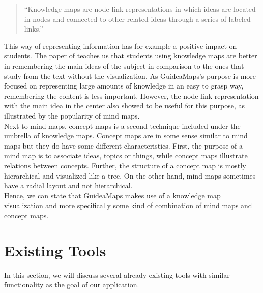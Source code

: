 \begin{quote}
``Knowledge maps are node-link representations in which ideas are located in nodes and connected to other related ideas through a series of labeled links.'' \hfill 
\end{quote}

This way of representing information has for example a positive impact on students. The paper of \cite{knowledgemapsodonnell} teaches us that students using knowledge maps are better in remembering the main ideas of the subject in comparison to the ones that study from the text without the visualization. As GuideaMaps's purpose is more focused on representing large amounts of knowledge in an easy to grasp way, remembering the content is less important. However, the node-link representation with the main idea in the center also showed to be useful for this purpose, as illustrated by the popularity of mind maps.\\

Next to mind maps, concept maps is a second technique included under the umbrella of knowledge maps. Concept maps are in some sense similar to mind maps but they do have some different characteristics. First, the purpose of a mind map is to associate ideas, topics or things, while concept maps illustrate relations between concepts. Further, the structure of a concept map is mostly hierarchical and visualized like a tree. On the other hand, mind maps sometimes have a radial layout and not hierarchical. \citep{davies} \\

Hence, we can state that GuideaMaps makes use of a knowledge map visualization and more specifically some kind of combination of mind maps and concept maps.



\section{Existing Tools}\label{sec:existing-tools}
In this section, we will discuss several already existing tools with similar functionality as the goal of our application.

